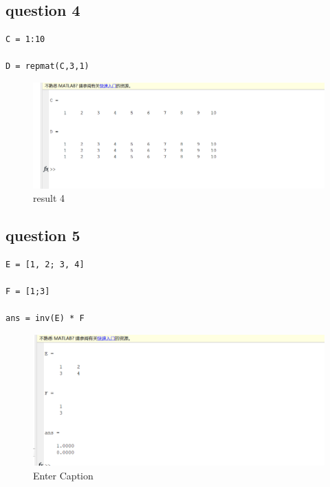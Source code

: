 \documentclass{article}
\begin{document}
\subsection{question 4}
\begin{lstlisting}
C = 1:10

D = repmat(C,3,1)
\end{lstlisting}
\begin{figure}[H]
    \centering
    \includegraphics[width=1\linewidth]{4.png}
    \caption{result 4}
    \label{fig:4}
\end{figure}

\subsection{question 5}
\begin{lstlisting}
E = [1, 2; 3, 4]

F = [1;3]

ans = inv(E) * F
\end{lstlisting}
\begin{figure}[H]
    \centering
    \includegraphics[width=1\linewidth]{5.png}
    \caption{Enter Caption}
    \label{fig:5}
\end{figure}
\end{document}
